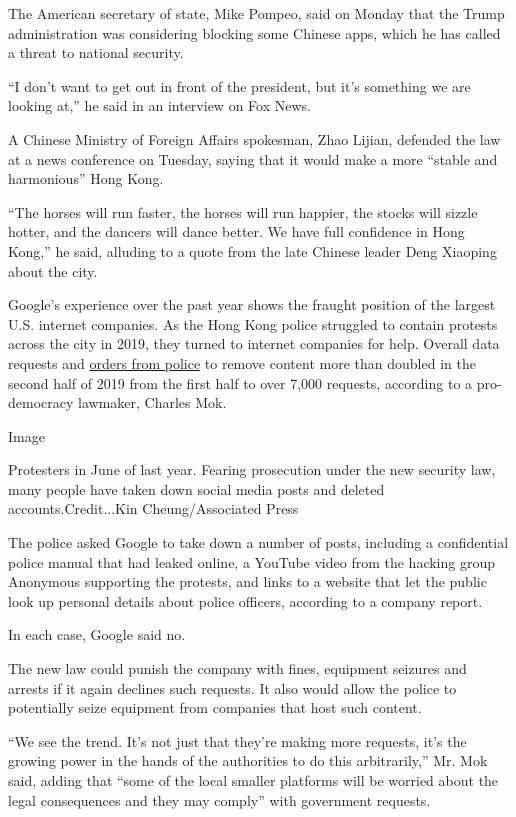 The American secretary of state, Mike Pompeo, said on Monday that the
Trump administration was considering blocking some Chinese apps, which
he has called a threat to national security.

``I don't want to get out in front of the president, but it's something
we are looking at,'' he said in an interview on Fox News.

A Chinese Ministry of Foreign Affairs spokesman, Zhao Lijian, defended
the law at a news conference on Tuesday, saying that it would make a
more ``stable and harmonious'' Hong Kong.

``The horses will run faster, the horses will run happier, the stocks
will sizzle hotter, and the dancers will dance better. We have full
confidence in Hong Kong,'' he said, alluding to a quote from the late
Chinese leader Deng Xiaoping about the city.

Google's experience over the past year shows the fraught position of the
largest U.S. internet companies. As the Hong Kong police struggled to
contain protests across the city in 2019, they turned to internet
companies for help. Overall data requests and
\href{https://www.charlesmok.hk/legco/council-question-requests-made-to-information-and-communication-technology-companies-for-disclosure-and-removal-of-information/}{orders
from police} to remove content more than doubled in the second half of
2019 from the first half to over 7,000 requests, according to a
pro-democracy lawmaker, Charles Mok.

Image

Protesters in June of last year. Fearing prosecution under the new
security law, many people have taken down social media posts and deleted
accounts.Credit...Kin Cheung/Associated Press

The police asked Google to take down a number of posts, including a
confidential police manual that had leaked online, a YouTube video from
the hacking group Anonymous supporting the protests, and links to a
website that let the public look up personal details about police
officers, according to a company report.

In each case, Google said no.

The new law could punish the company with fines, equipment seizures and
arrests if it again declines such requests. It also would allow the
police to potentially seize equipment from companies that host such
content.

``We see the trend. It's not just that they're making more requests,
it's the growing power in the hands of the authorities to do this
arbitrarily,'' Mr. Mok said, adding that ``some of the local smaller
platforms will be worried about the legal consequences and they may
comply'' with government requests.

